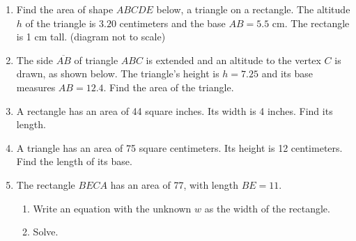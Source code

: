 \begin{enumerate}
\item Find the area of shape $ABCDE$ below, a triangle on a rectangle. The altitude $h$ of the triangle is $3.20$ centimeters and the base $AB=5.5$ cm. The rectangle is 1 cm tall. (diagram not to scale) \\[0.5cm]
       \vspace{1.0cm}

\item The side $\overline{AB}$ of triangle $ABC$ is extended and an altitude to the vertex $C$ is drawn, as shown below. The triangle's height is $h=7.25$ and its base measures $AB=12.4$. Find the area of the triangle.\\[0.25cm]

\item A rectangle has an area of 44 square inches. Its width is 4 inches. Find its length.
\vspace{2.0cm}

\item A triangle has an area of 75 square centimeters. Its height is 12 centimeters. Find the length of its base.
   
\item The rectangle $BECA$ has an area of 77, with length $BE=11$.
  \begin{enumerate}
    \item Write an equation with the unknown $w$ as the width of the rectangle. 
    \item Solve.
  \end{enumerate}
  \begin{flushright}
  \end{flushright}



\end{enumerate}
